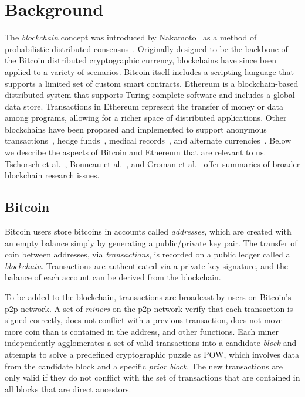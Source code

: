 \documentclass[10pt,sigconf]{acmart}
\newcommand{\para }[1]{\smallskip \noindent {\bf #1}}
\newcommand{\1}{{\em (i)}}
\newcommand{\2}{{\em (ii)}}
\newcommand{\3}{{\em (iii)}}
\newcommand{\4}{{\em (iv)}}
\newcommand{\5}{{\em (v)}}
\begin{document}
\section{Background}\label{sec:basics}
The \emph{blockchain} concept was introduced by Nakamoto~\cite{Nakamoto:2009} as a
method of probabilistic distributed consensus~\cite{Vukolic:2015}.
Originally designed to be the backbone of the Bitcoin distributed
cryptographic currency, blockchains have since been applied to a
variety of scenarios. Bitcoin itself includes a scripting language
that supports a limited set of custom smart contracts.
Ethereum\cite{ethereum} is a blockchain-based distributed system that
supports Turing-complete software and includes a global data store.
Transactions in Ethereum represent the transfer of money or
data among programs, allowing for a richer space of distributed
applications. Other blockchains have been proposed and implemented to
support anonymous transactions~\cite{sasson:2014}, hedge
funds~\cite{digixdao}, medical records~\cite{Azaria:2016}, and
alternate currencies~\cite{litecoin,digix}. Below we describe the
aspects of Bitcoin and Ethereum that are relevant to us.
Tschorsch et al.~\cite{Tschorsch:2016}, Bonneau et
al.~\cite{bonneau:2015}, and Croman et al.~\cite{Croman:2016} offer
summaries of broader blockchain research issues.

\subsection{Bitcoin}
\para{Accounts.} Bitcoin users store bitcoins in accounts called {\em
  addresses}, which are created with an empty balance simply by
generating a public/private key pair. The transfer of coin between
addresses, via {\em transactions}, is recorded on a public ledger
called a {\em blockchain}. Transactions are authenticated via a
 private key signature, and the balance of each account can be 
derived from the blockchain. 

\para{Adding to the blockchain.} To be added to the blockchain,
transactions are broadcast by users on Bitcoin's p2p network. A set of
\emph{miners} on the p2p network verify that each transaction is
signed correctly, does not conflict with a previous transaction, does not
move more coin than is contained in the address, and other functions.
Each miner independently agglomerates a set of valid transactions into
a candidate \emph{block} and attempts to solve a predefined
cryptographic puzzle as POW, which involves data
from the candidate block and a specific {\em prior block}. The
new transactions  are only valid if they do not
conflict with the set of transactions that are contained in all
blocks that are direct ancestors.
\end{document}
